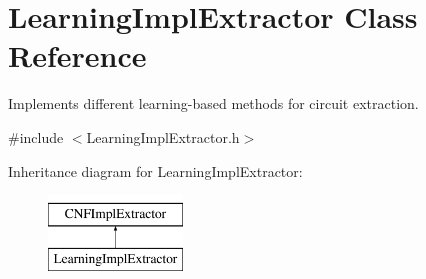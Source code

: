 \hypertarget{classLearningImplExtractor}{\section{Learning\-Impl\-Extractor Class Reference}
\label{classLearningImplExtractor}
}


Implements different learning-\/based methods for circuit extraction.  




{\ttfamily \#include $<$Learning\-Impl\-Extractor.\-h$>$}

Inheritance diagram for Learning\-Impl\-Extractor\-:\begin{figure}[H]
\begin{center}
\leavevmode
\includegraphics[height=2.000000cm]{classLearningImplExtractor}
\end{center}
\end{figure}
